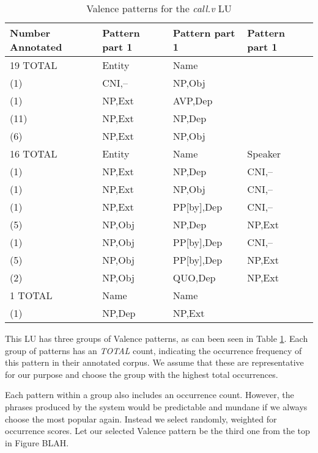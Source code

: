 \begin{table}
    \begin{tabular}{|llll|}
    \hline
    Number Annotated & Pattern part 1 & Pattern part 1 & Pattern part 1 \\ \hline
    19 TOTAL         & Entity         & Name           & ~              \\
    (1)              & CNI,--        & NP,Obj        & ~              \\
    (1)              & NP,Ext        & AVP,Dep       & ~              \\
    (11)             & NP,Ext        & NP,Dep        & ~              \\
    (6)              & NP,Ext        & NP,Obj        & ~              \\ \hline
    16 TOTAL         & Entity         & Name           & Speaker        \\
    (1)              & NP,Ext        & NP,Dep        & CNI,--        \\
    (1)              & NP,Ext        & NP,Obj        & CNI,--        \\
    (1)              & NP,Ext        & PP[by],Dep    & CNI,--        \\
    (5)              & NP,Obj        & NP,Dep        & NP,Ext        \\
    (1)              & NP,Obj        & PP[by],Dep    & CNI,--        \\
    (5)              & NP,Obj        & PP[by],Dep    & NP,Ext        \\
    (2)              & NP,Obj        & QUO,Dep       & NP,Ext        \\ \hline
    1 TOTAL          & Name           & Name           & ~              \\
    (1)              & NP,Dep        & NP,Ext        & ~              \\ \hline
    \end{tabular}
\caption{Valence patterns for the \textit{call.v} LU}
\label{tab:call-val}
\end{table}

This LU has three groups of Valence patterns, as can been seen in Table \ref{tab:call-val}. Each group of patterns has an \textit{TOTAL} count, indicating the occurrence frequency of this pattern in their annotated corpus. We assume that these are representative for our purpose and choose the group with the highest total occurrences.

Each pattern within a group also includes an occurrence count. However, the phrases produced by the system would be predictable and mundane if we always choose the most popular again. Instead we select randomly, weighted for occurrence scores. Let our selected Valence pattern be the third one from the top in Figure BLAH.

